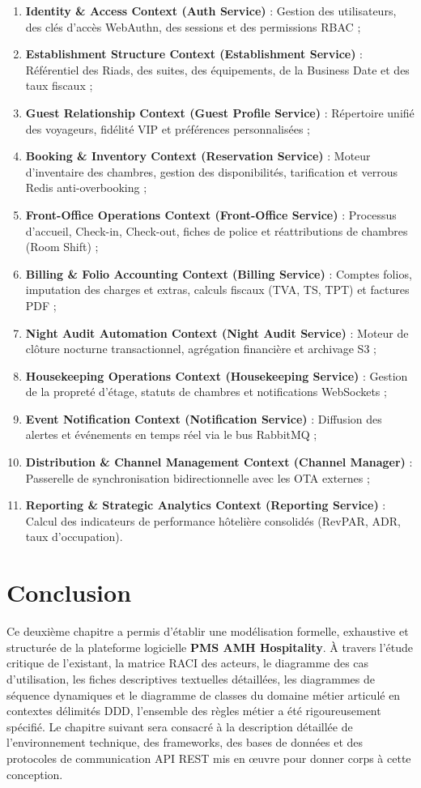 \begin{enumerate}
    \item \textbf{Identity \& Access Context (Auth Service)} : Gestion des utilisateurs, des clés d'accès WebAuthn, des sessions et des permissions RBAC ;
    \item \textbf{Establishment Structure Context (Establishment Service)} : Référentiel des Riads, des suites, des équipements, de la Business Date et des taux fiscaux ;
    \item \textbf{Guest Relationship Context (Guest Profile Service)} : Répertoire unifié des voyageurs, fidélité VIP et préférences personnalisées ;
    \item \textbf{Booking \& Inventory Context (Reservation Service)} : Moteur d'inventaire des chambres, gestion des disponibilités, tarification et verrous Redis anti-overbooking ;
    \item \textbf{Front-Office Operations Context (Front-Office Service)} : Processus d'accueil, Check-in, Check-out, fiches de police et réattributions de chambres (Room Shift) ;
    \item \textbf{Billing \& Folio Accounting Context (Billing Service)} : Comptes folios, imputation des charges et extras, calculs fiscaux (TVA, TS, TPT) et factures PDF ;
    \item \textbf{Night Audit Automation Context (Night Audit Service)} : Moteur de clôture nocturne transactionnel, agrégation financière et archivage S3 ;
    \item \textbf{Housekeeping Operations Context (Housekeeping Service)} : Gestion de la propreté d'étage, statuts de chambres et notifications WebSockets ;
    \item \textbf{Event Notification Context (Notification Service)} : Diffusion des alertes et événements en temps réel via le bus RabbitMQ ;
    \item \textbf{Distribution \& Channel Management Context (Channel Manager)} : Passerelle de synchronisation bidirectionnelle avec les OTA externes ;
    \item \textbf{Reporting \& Strategic Analytics Context (Reporting Service)} : Calcul des indicateurs de performance hôtelière consolidés (RevPAR, ADR, taux d'occupation).
\end{enumerate}

\section{Conclusion}

Ce deuxième chapitre a permis d'établir une modélisation formelle, exhaustive et structurée de la plateforme logicielle \textbf{PMS AMH Hospitality}. À travers l'étude critique de l'existant, la matrice RACI des acteurs, le diagramme des cas d'utilisation, les fiches descriptives textuelles détaillées, les diagrammes de séquence dynamiques et le diagramme de classes du domaine métier articulé en contextes délimités DDD, l'ensemble des règles métier a été rigoureusement spécifié. Le chapitre suivant sera consacré à la description détaillée de l'environnement technique, des frameworks, des bases de données et des protocoles de communication API REST mis en œuvre pour donner corps à cette conception.
